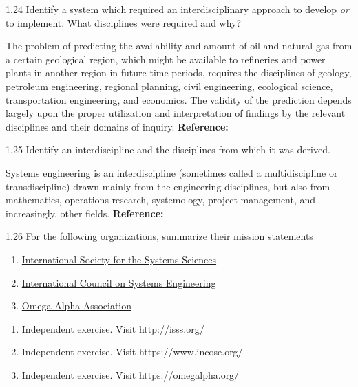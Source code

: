 \begin{exsol@exercise}{1.24}
    \label{sea-1-32}
        Identify a system which required an interdisciplinary approach to develop \textit{or} to implement. What disciplines were required and why?
\end{exsol@exercise}
\begin{exsol@solution}{}
        The problem of predicting the availability and amount of oil and natural gas from a certain geological region, which might be available to refineries and power plants in another region in future time periods, requires the disciplines of geology, petroleum engineering, regional planning, civil engineering, ecological science, transportation engineering, and economics. The validity of the prediction depends largely upon the proper utilization and interpretation of findings by the relevant disciplines and their domains of inquiry. \textbf{Reference:}
\end{exsol@solution}
\begin{exsol@exercise}{1.25}
    \label{sea-1-33}
        Identify an interdiscipline and the disciplines from which it was derived.
\end{exsol@exercise}
\begin{exsol@solution}{}
        Systems engineering is an interdiscipline (sometimes called a multidiscipline or transdiscipline) drawn mainly from the engineering disciplines, but also from mathematics, operations research, systemology, project management, and increasingly, other fields. \textbf{Reference:}
\end{exsol@solution}
\begin{exsol@exercise}{1.26}
    \label{sea-1-35_36_38}
        For the following organizations, summarize their mission statements
        \begin{enumerate}[label=\alph*)]
            \item \href{http://isss.org/}{International Society for the Systems Sciences}
            \item \href{https://www.incose.org/}{International Council on Systems Engineering}
            \item \href{https://omegalpha.org/}{Omega Alpha Association}
        \end{enumerate}
\end{exsol@exercise}
\begin{exsol@solution}{}
        \begin{enumerate}[label=\alph*)]
            \item Independent exercise. Visit http://isss.org/
            \item Independent exercise. Visit https://www.incose.org/
            \item Independent exercise. Visit https://omegalpha.org/
        \end{enumerate}
\end{exsol@solution}
